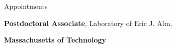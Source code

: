 \begin{rubric}{Appointments}

\entry*[2019--]
		\textbf{Postdoctoral Associate}, Laboratory of Eric J. Alm,
		\par \textbf{Massachusetts of Technology}


\end{rubric}
